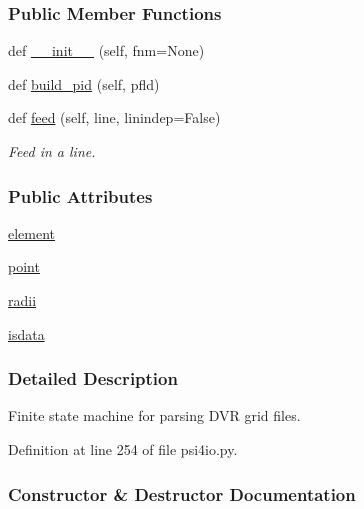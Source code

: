 \subsubsection*{Public Member Functions}
\begin{DoxyCompactItemize}
\item 
def \hyperlink{classsrc_1_1psi4io_1_1Grid__Reader_a1756365ba771c470cf3b8a21373893e8}{\+\_\+\+\_\+init\+\_\+\+\_\+} (self, fnm=None)
\item 
def \hyperlink{classsrc_1_1psi4io_1_1Grid__Reader_ac34edbf7351494da884a7add4d30c3bf}{build\+\_\+pid} (self, pfld)
\item 
def \hyperlink{classsrc_1_1psi4io_1_1Grid__Reader_aebcee69c16c83386050a36174be65e5c}{feed} (self, line, linindep=False)
\begin{DoxyCompactList}\small\item\em Feed in a line. \end{DoxyCompactList}\end{DoxyCompactItemize}
\subsubsection*{Public Attributes}
\begin{DoxyCompactItemize}
\item 
\hyperlink{classsrc_1_1psi4io_1_1Grid__Reader_a5a7725e5cd7e7f33e04cfb64b4318f23}{element}
\item 
\hyperlink{classsrc_1_1psi4io_1_1Grid__Reader_afe33f5430504933902ce9fdaeceb5dde}{point}
\item 
\hyperlink{classsrc_1_1psi4io_1_1Grid__Reader_a6867b33c51d33ebc01aa6f1036ebf719}{radii}
\item 
\hyperlink{classsrc_1_1psi4io_1_1Grid__Reader_ad7cafbbec81a0c3c9ba7f9f2c5c1d28b}{isdata}
\end{DoxyCompactItemize}


\subsubsection{Detailed Description}
Finite state machine for parsing D\+VR grid files. 

Definition at line 254 of file psi4io.\+py.



\subsubsection{Constructor \& Destructor Documentation}
\mbox{\label{classsrc_1_1psi4io_1_1Grid__Reader_a1756365ba771c470cf3b8a21373893e8}} 
